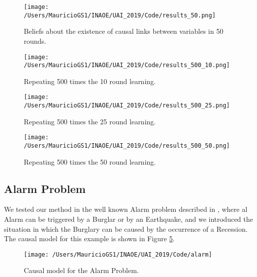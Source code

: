 \documentclass[letterpaper]{article}
\begin{document}
\begin{figure}[ht]
\vskip 0.2in
\begin{center}
\centerline{\texttt{[image: /Users/MauricioGS1/INAOE/UAI\_2019/Code/results\_50.png]}}
\caption{Beliefs about the existence of causal links between variables in 50 rounds.}
\label{50_rounds}
\end{center}
\vskip -0.2in
\end{figure}

\begin{figure}[ht]
\vskip 0.2in
\begin{center}
\centerline{\texttt{[image: /Users/MauricioGS1/INAOE/UAI\_2019/Code/results\_500\_10.png]}}
\caption{Repeating 500 times the 10 round learning.}
\label{500_10_rounds}
\end{center}
\vskip -0.2in
\end{figure}

\begin{figure}[ht]
\vskip 0.2in
\begin{center}
\centerline{\texttt{[image: /Users/MauricioGS1/INAOE/UAI\_2019/Code/results\_500\_25.png]}}
\caption{Repeating 500 times the 25 round learning.}
\label{500_25_rounds}
\end{center}
\vskip -0.2in
\end{figure}

\begin{figure}[ht]
\vskip 0.2in
\begin{center}
\centerline{\texttt{[image: /Users/MauricioGS1/INAOE/UAI\_2019/Code/results\_500\_50.png]}}
\caption{Repeating 500 times the 50 round learning.}
\label{500_50_rounds}
\end{center}
\vskip -0.2in
\end{figure}

\subsection{Alarm Problem}
We tested our method in the well known Alarm problem described in \cite{barber2012bayesian}, where al Alarm can be triggered by a Burglar or by an Earthquake, and we introduced the situation in which the Burglary can be caused by the occurrence of a Recession. The causal model for this example is shown in Figure \ref{alarm_problem}.

\begin{figure}[ht]
\vskip 0.2in
\begin{center}
\centerline{\texttt{[image: /Users/MauricioGS1/INAOE/UAI\_2019/Code/alarm]}}
\caption{Causal model for the Alarm Problem.}
\label{alarm_problem}
\end{center}
\vskip -0.2in
\end{figure}
\end{document}
